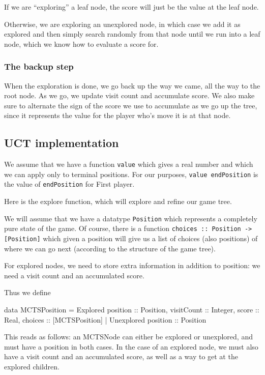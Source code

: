 If we are ``exploring'' a leaf node, the score will just be the value at the leaf node.

Otherwise, we are exploring an unexplored node, in which case we add it as explored and then simply search randomly from that node until we run into a leaf node, which we know how to evaluate a score for.

\subsubsection{The backup step}

When the exploration is done, we go back up the way we came, all the way to the root node.
As we go, we update visit count and accumulate score.
We also make sure to alternate the sign of the score we use to accumulate as we go up the tree, since it represents the value for the player who's move it is at that node.


\subsection{UCT implementation}


We assume that we have a function \texttt{value} which gives a real number and which we can apply only to terminal positions.
For our purposes, \texttt{value endPosition} is the value of \texttt{endPosition} for First player.


Here is the explore function, which will explore and refine our game tree.

We will assume that we have a datatype \texttt{Position} which represents a completely pure state of the game.
Of course, there is a function \texttt{choices :: Position -> [Position]} which given a position will give us a list of choices (also positions) of where we can go next (according to the structure of the game tree).

For explored nodes, we need to store extra information in addition to position: we need a visit count and an accumulated score. 

Thus we define

\begin{code}
  data MCTSPosition =
    Explored {position :: Position, visitCount :: Integer,
              score :: Real, choices :: [MCTSPosition]} |
    Unexplored {position :: Position}
\end{code}

This reads as follows: an MCTSNode can either be explored or unexplored, and must have a position in both cases.
In the case of an explored node, we must also have a visit count and an accumulated score, as well as a way to get at the explored children.


